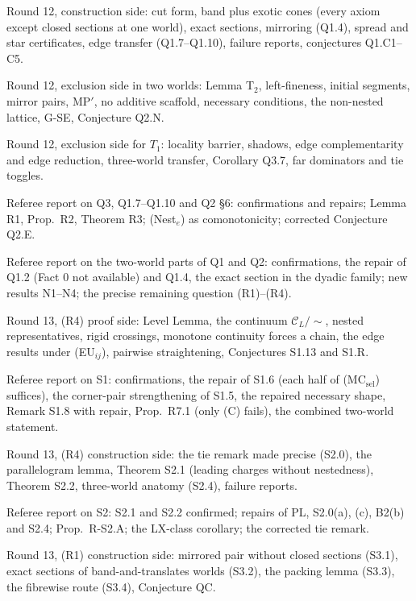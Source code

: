 \documentclass[11pt]{article}
\theoremstyle{definition}
\theoremstyle{remark}
\newcommand{\C}{\mathcal C}
\begin{document}
\begin{description}[leftmargin=*,font=\normalfont\ttfamily,style=nextline]
\item[Q1\_notes.md] Round 12, construction side: cut form, band plus exotic cones (every axiom except closed sections at one world), exact sections, mirroring (Q1.4), spread and star certificates, edge transfer (Q1.7--Q1.10), failure reports, conjectures Q1.C1--C5.
\item[Q2\_notes.md] Round 12, exclusion side in two worlds: Lemma T$_2$, left-fineness, initial segments, mirror pairs, MP$'$, no additive scaffold, necessary conditions, the non-nested lattice, G-SE, Conjecture Q2.N.
\item[Q3\_notes.md] Round 12, exclusion side for $T_1$: locality barrier, shadows, edge complementarity and edge reduction, three-world transfer, Corollary Q3.7, far dominators and tie toggles.
\item[Q3\_referee.md] Referee report on Q3, Q1.7--Q1.10 and Q2 \S6: confirmations and repairs; Lemma R1, Prop.~R2, Theorem R3; (Nest$_e$) as comonotonicity; corrected Conjecture Q2.E.
\item[Q12\_referee.md] Referee report on the two-world parts of Q1 and Q2: confirmations, the repair of Q1.2 (Fact 0 not available) and Q1.4, the exact section in the dyadic family; new results N1--N4; the precise remaining question (R1)--(R4).
\item[S1\_notes.md] Round 13, (R4) proof side: Level Lemma, the continuum $\C_L/{\sim}$, nested representatives, rigid crossings, monotone continuity forces a chain, the edge results under (EU$_{ij}$), pairwise straightening, Conjectures S1.13 and S1.R.
\item[S1\_referee.md] Referee report on S1: confirmations, the repair of S1.6 (each half of (MC$_{\mathrm{sel}}$) suffices), the corner-pair strengthening of S1.5, the repaired necessary shape, Remark S1.8 with repair, Prop.~R7.1 (only (C) fails), the combined two-world statement.
\item[S2\_notes.md] Round 13, (R4) construction side: the tie remark made precise (S2.0), the parallelogram lemma, Theorem S2.1 (leading charges without nestedness), Theorem S2.2, three-world anatomy (S2.4), failure reports.
\item[S2\_referee.md] Referee report on S2: S2.1 and S2.2 confirmed; repairs of PL, S2.0(a), (c), B2(b) and S2.4; Prop.~R-S2.A; the LX-class corollary; the corrected tie remark.
\item[S3\_notes.md] Round 13, (R1) construction side: mirrored pair without closed sections (S3.1), exact sections of band-and-translates worlds (S3.2), the packing lemma (S3.3), the fibrewise route (S3.4), Conjecture QC.

\end{description}
\end{document}
